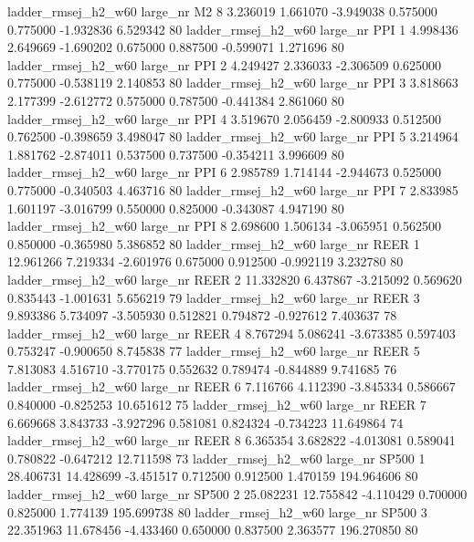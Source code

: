 ladder_rmsej_h2_w60   large_nr       M2                 8  3.236019  1.661070  -3.949038 0.575000 0.775000 -1.932836    6.529342 80
ladder_rmsej_h2_w60   large_nr      PPI                 1  4.998436  2.649669  -1.690202 0.675000 0.887500 -0.599071    1.271696 80
ladder_rmsej_h2_w60   large_nr      PPI                 2  4.249427  2.336033  -2.306509 0.625000 0.775000 -0.538119    2.140853 80
ladder_rmsej_h2_w60   large_nr      PPI                 3  3.818663  2.177399  -2.612772 0.575000 0.787500 -0.441384    2.861060 80
ladder_rmsej_h2_w60   large_nr      PPI                 4  3.519670  2.056459  -2.800933 0.512500 0.762500 -0.398659    3.498047 80
ladder_rmsej_h2_w60   large_nr      PPI                 5  3.214964  1.881762  -2.874011 0.537500 0.737500 -0.354211    3.996609 80
ladder_rmsej_h2_w60   large_nr      PPI                 6  2.985789  1.714144  -2.944673 0.525000 0.775000 -0.340503    4.463716 80
ladder_rmsej_h2_w60   large_nr      PPI                 7  2.833985  1.601197  -3.016799 0.550000 0.825000 -0.343087    4.947190 80
ladder_rmsej_h2_w60   large_nr      PPI                 8  2.698600  1.506134  -3.065951 0.562500 0.850000 -0.365980    5.386852 80
ladder_rmsej_h2_w60   large_nr     REER                 1 12.961266  7.219334  -2.601976 0.675000 0.912500 -0.992119    3.232780 80
ladder_rmsej_h2_w60   large_nr     REER                 2 11.332820  6.437867  -3.215092 0.569620 0.835443 -1.001631    5.656219 79
ladder_rmsej_h2_w60   large_nr     REER                 3  9.893386  5.734097  -3.505930 0.512821 0.794872 -0.927612    7.403637 78
ladder_rmsej_h2_w60   large_nr     REER                 4  8.767294  5.086241  -3.673385 0.597403 0.753247 -0.900650    8.745838 77
ladder_rmsej_h2_w60   large_nr     REER                 5  7.813083  4.516710  -3.770175 0.552632 0.789474 -0.844889    9.741685 76
ladder_rmsej_h2_w60   large_nr     REER                 6  7.116766  4.112390  -3.845334 0.586667 0.840000 -0.825253   10.651612 75
ladder_rmsej_h2_w60   large_nr     REER                 7  6.669668  3.843733  -3.927296 0.581081 0.824324 -0.734223   11.649864 74
ladder_rmsej_h2_w60   large_nr     REER                 8  6.365354  3.682822  -4.013081 0.589041 0.780822 -0.647212   12.711598 73
ladder_rmsej_h2_w60   large_nr    SP500                 1 28.406731 14.428699  -3.451517 0.712500 0.912500  1.470159  194.964606 80
ladder_rmsej_h2_w60   large_nr    SP500                 2 25.082231 12.755842  -4.110429 0.700000 0.825000  1.774139  195.699738 80
ladder_rmsej_h2_w60   large_nr    SP500                 3 22.351963 11.678456  -4.433460 0.650000 0.837500  2.363577  196.270850 80
